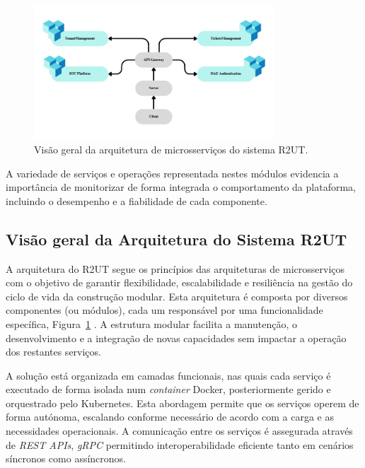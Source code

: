\begin{figure}[H]
    \centering
    \includegraphics[width=0.8\textwidth]{images/r2ut/diagrama_new.png}
    \caption{Visão geral da arquitetura de microsserviços do sistema R2UT.}
    \label{fig:otel_arch}
\end{figure}


A variedade de serviços e operações representada nestes módulos evidencia a importância de monitorizar de forma integrada o comportamento da plataforma, incluindo o desempenho e a fiabilidade de cada componente. 

 

\clearpage


\subsection{Visão geral da Arquitetura do Sistema R2UT}

A arquitetura do R2UT segue os princípios das arquiteturas de microsserviços com o objetivo de garantir flexibilidade, escalabilidade e resiliência na gestão do ciclo de vida da construção modular. Esta arquitetura é composta por diversos componentes (ou módulos), cada um responsável por uma funcionalidade específica, Figura~\ref{fig:otel_arch} . A estrutura modular facilita a manutenção, o desenvolvimento e a integração de novas capacidades sem impactar a operação dos restantes serviços.

A solução está organizada em camadas funcionais, nas quais cada serviço é executado de forma isolada num \textit{container} Docker, posteriormente gerido e orquestrado pelo Kubernetes. Esta abordagem permite que os serviços operem de forma autónoma, escalando conforme necessário de acordo com a carga e as necessidades operacionais. A comunicação entre os serviços é assegurada através de \textit{REST APIs}, \textit{gRPC} permitindo interoperabilidade eficiente tanto em cenários síncronos como assíncronos.






